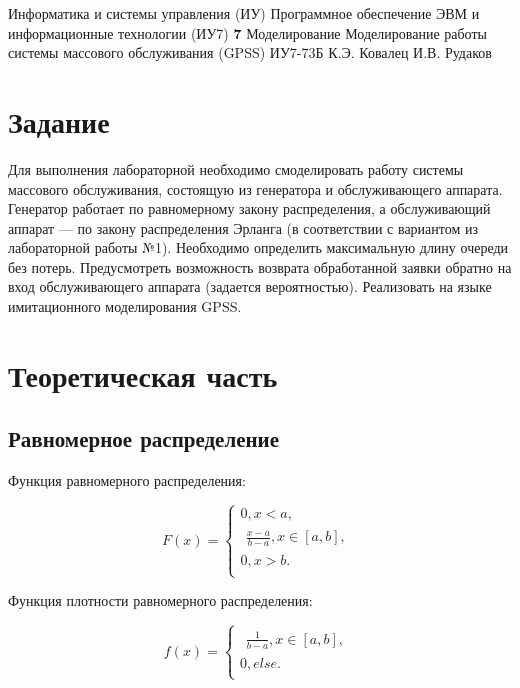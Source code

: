 \documentclass{bmstu}
\begin{document}
\makereporttitle
{Информатика и системы управления (ИУ)}
{Программное обеспечение ЭВМ и информационные технологии (ИУ7)}
{\textbf{7}}
{Моделирование}
{Моделирование работы системы массового обслуживания (GPSS)}
{}
{ИУ7-73Б}
{К.Э. Ковалец}
{И.В. Рудаков}


\setcounter{page}{2}
\renewcommand{\contentsname}{Содержание} 
\tableofcontents

\chapter{Задание}

Для выполнения лабораторной необходимо смоделировать работу системы массового обслуживания, состоящую из генератора и обслуживающего аппарата. Генератор работает по равномерному закону распределения, а обслуживающий аппарат --- по закону распределения Эрланга (в соответствии с вариантом из лабораторной работы №1). Необходимо определить максимальную длину очереди без потерь. Предусмотреть возможность возврата обработанной заявки обратно на вход обслуживающего аппарата (задается вероятностью). Реализовать на языке имитационного моделирования GPSS.

\chapter{Теоретическая часть}

\section{Равномерное распределение}

Функция равномерного распределения:

\begin{equation}
    F(x) =
    \begin{cases}
            0, x < a, \\
            \begin{aligned}
                \frac{x -  a}{b - a}, x \in [a, b], 
            \end{aligned}\\
            0, x > b. \\
    \end{cases}
\end{equation}

Функция плотности равномерного распределения:

\begin{equation}
    f(x) =
    \begin{cases}
            \begin{aligned}
                \frac{1}{b - a}, x \in [a, b], 
            \end{aligned}\\
            0, else. \\
    \end{cases}
\end{equation}
\end{document}
